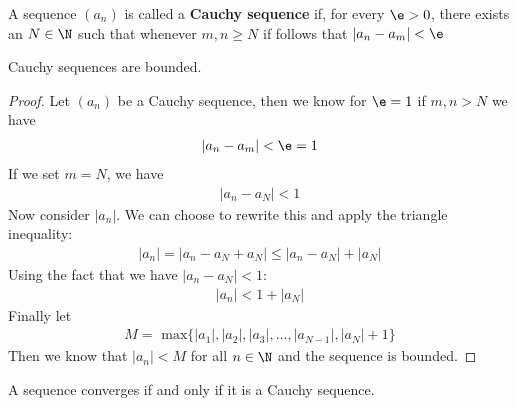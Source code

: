\begin{definition}
	A sequence $\left( a_n \right) $ is called a \textbf{Cauchy sequence} if, for every $\e > 0$, there exists an $N \in \N$ such that whenever $m, n \ge N$ if follows that $\left|a_n - a_m\right| < \e$
\end{definition}

\begin{theorem}
	Cauchy sequences are bounded.
\end{theorem}

\begin{proof}
	Let $\left( a_n \right) $ be a Cauchy sequence, then we know for $\e = 1$ if $m, n > N$ we have
	\begin{align}
		\left|a_n - a_m\right| < \e = 1
	\end{align}
	If we set $m = N$, we have
	\begin{align}
		\left|a_n - a_N\right| < 1
	\end{align}
	Now consider $\left|a_n\right|$. We can choose to rewrite this and apply the triangle inequality:
	\begin{align}
		\left|a_n\right| = \left|a_n - a_N + a_N\right| \le \left|a_n - a_N\right| + \left|a_N\right|
	\end{align}
	Using the fact that we have $\left|a_n - a_N\right| < 1$:
	\begin{align}
		\left|a_n\right| < 1 + \left|a_N\right|
	\end{align}
	Finally let
	\begin{align}
		M = \text{ max}\{\left|a_1\right|, \left|a_2\right|, \left|a_3\right|, \ldots, \left|a_{N-1}\right|, \left|a_N\right| + 1\} 
	\end{align}
	Then we know that $\left|a_n\right| < M$ for all $n \in \N$ and the sequence is bounded.
\end{proof}

\begin{theorem}
	A sequence converges if and only if it is a Cauchy sequence.
\end{theorem}

